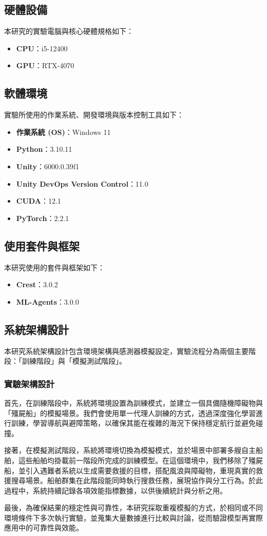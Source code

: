 \documentclass[12pt,a4paper]{article}
\begin{document}
\subsection{硬體設備}
本研究的實驗電腦與核心硬體規格如下：
\begin{itemize}
	\item \textbf{CPU}：i5-12400
  	\item \textbf{GPU}：RTX-4070
\end{itemize}

\subsection{軟體環境}
實驗所使用的作業系統、開發環境與版本控制工具如下：
\begin{itemize}
    \item \textbf{作業系統 (OS)}：Windows 11
    \item \textbf{Python}：3.10.11
    \item \textbf{Unity}：6000.0.39f1
    \item \textbf{Unity DevOps Version Control}：11.0
    \item \textbf{CUDA}：12.1
    \item \textbf{PyTorch}：2.2.1
\end{itemize}

\subsection{使用套件與框架}
本研究使用的套件與框架如下：
\begin{itemize}
    \item \textbf{Crest}：3.0.2
    \item \textbf{ML-Agents}：3.0.0
\end{itemize}

\subsection{系統架構設計}
本研究系統架構設計包含環境架構與感測器模擬設定，實驗流程分為兩個主要階段：「訓練階段」與「模擬測試階段」。

\subsubsection{實驗架構設計}
首先，在訓練階段中，系統將環境設置為訓練模式，並建立一個具備隨機障礙物與「殭屍船」的模擬場景。我們會使用單一代理人訓練的方式，透過深度強化學習進行訓練，學習導航與避障策略，以確保其能在複雜的海況下保持穩定航行並避免碰撞。
\\ \par
接著，在模擬測試階段，系統將環境切換為模擬模式，並於場景中部署多艘自主船舶，這些船舶均掛載前一階段所完成的訓練模型。在這個環境中，我們移除了殭屍船，並引入遇難者系統以生成需要救援的目標，搭配風浪與障礙物，重現真實的救援搜尋場景。船舶群集在此階段能同時執行搜救任務，展現協作與分工行為。於此過程中，系統持續記錄各項效能指標數據，以供後續統計與分析之用。
\\ \par
最後，為確保結果的穩定性與可靠性，本研究採取重複模擬的方式，於相同或不同環境條件下多次執行實驗，並蒐集大量數據進行比較與討論，從而驗證模型再實際應用中的可靠性與效能。
\end{document}
